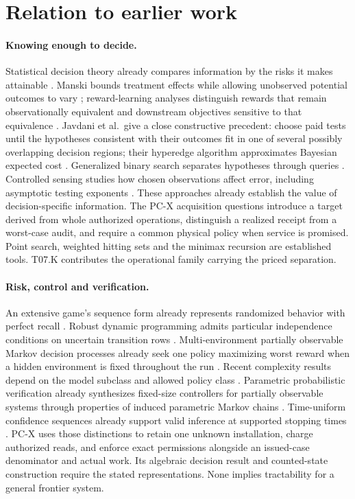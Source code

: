 \section{Relation to earlier work}\label{sec:related}
\paragraph{Knowing enough to decide.}
Statistical decision theory already compares information by the risks it makes attainable \citep{blackwell}. Manski bounds treatment effects while allowing unobserved potential outcomes to vary \citep{manski}; reward-learning analyses distinguish rewards that remain observationally equivalent and downstream objectives sensitive to that equivalence \citep{skalse}. Javdani et al.\ give a close constructive precedent: choose paid tests until the hypotheses consistent with their outcomes fit in one of several possibly overlapping decision regions; their hyperedge algorithm approximates Bayesian expected cost \citep{javdani}. Generalized binary search separates hypotheses through queries \citep{nowak}. Controlled sensing studies how chosen observations affect error, including asymptotic testing exponents \citep{nitinawarat}. These approaches already establish the value of decision-specific information. The PC-X acquisition questions introduce a target derived from whole authorized operations, distinguish a realized receipt from a worst-case audit, and require a common physical policy when service is promised. Point search, weighted hitting sets and the minimax recursion are established tools. T07.K contributes the operational family carrying the priced separation.

\paragraph{Risk, control and verification.}
An extensive game's sequence form already represents randomized behavior with perfect recall \citep{koller}. Robust dynamic programming admits particular independence conditions on uncertain transition rows \citep{iyengar}. Multi-environment partially observable Markov decision processes already seek one policy maximizing worst reward when a hidden environment is fixed throughout the run \citep{bovy}. Recent complexity results depend on the model subclass and allowed policy class \citep{bovycomplex}. Parametric probabilistic verification already synthesizes fixed-size controllers for partially observable systems through properties of induced parametric Markov chains \citep{junges}. Time-uniform confidence sequences already support valid inference at supported stopping times \citep{howard}. PC-X uses those distinctions to retain one unknown installation, charge authorized reads, and enforce exact permissions alongside an issued-case denominator and actual work. Its algebraic decision result and counted-state construction require the stated representations. None implies tractability for a general frontier system.

